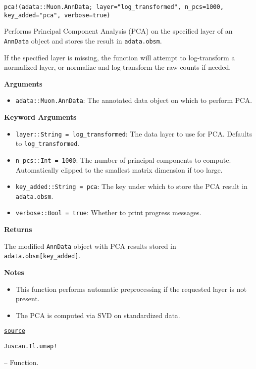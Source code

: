 \documentclass[oneside]{memoir}
\begin{document}
\begin{adjustwidth}{2em}{0pt}


\begin{verbatim}
pca!(adata::Muon.AnnData; layer="log_transformed", n_pcs=1000, key_added="pca", verbose=true)
\end{verbatim}

Performs Principal Component Analysis (PCA) on the specified layer of an \texttt{AnnData} object and stores the result in \texttt{adata.obsm}.

If the specified layer is missing, the function will attempt to log-transform a normalized layer, or normalize and log-transform the raw counts if needed.

\textbf{Arguments}

\begin{itemize}
\item \texttt{adata::Muon.AnnData}: The annotated data object on which to perform PCA.

\end{itemize}
\textbf{Keyword Arguments}

\begin{itemize}
\item \texttt{layer::String = {\textquotedbl}log\_transformed{\textquotedbl}}: The data layer to use for PCA. Defaults to \texttt{{\textquotedbl}log\_transformed{\textquotedbl}}.


\item \texttt{n\_pcs::Int = 1000}: The number of principal components to compute. Automatically clipped to the smallest matrix dimension if too large.


\item \texttt{key\_added::String = {\textquotedbl}pca{\textquotedbl}}: The key under which to store the PCA result in \texttt{adata.obsm}.


\item \texttt{verbose::Bool = true}: Whether to print progress messages.

\end{itemize}
\textbf{Returns}

The modified \texttt{AnnData} object with PCA results stored in \texttt{adata.obsm[key\_added]}.

\textbf{Notes}

\begin{itemize}
\item This function performs automatic preprocessing if the requested layer is not present.


\item The PCA is computed via SVD on standardized data.

\end{itemize}


\href{https://github.com/zehua0417/Juscan.jl/blob/393ad1b827b678ea98a738f92af658ee9ed9a403/src/tools/pca.jl#L11-L34}{\texttt{source}}


\end{adjustwidth}
\hypertarget{8135834044587738356}{\texttt{Juscan.Tl.umap!}}  -- {Function.}
\end{document}
